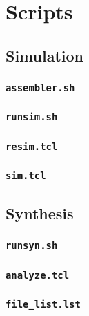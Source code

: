 \chapter{Scripts}
\label{app:scripts}

\section{Simulation}

\subsection{\texttt{assembler.sh}} \label{app:assembler}


\subsection{\texttt{runsim.sh}} \label{app:runsim}


\subsection{\texttt{resim.tcl}} \label{app:resim}


\subsection{\texttt{sim.tcl}} \label{app:sim}


\newpage
\section{Synthesis}

\subsection{\texttt{runsyn.sh}} \label{app:runsyn}


\subsection{\texttt{analyze.tcl}} \label{app:analyze}


\subsection{\texttt{file\_list.lst}} \label{app:file_list}


